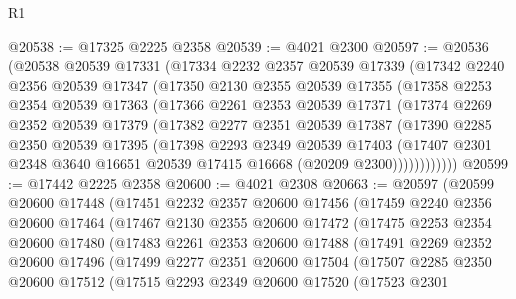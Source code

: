 \begin{lexlean}{R1}
\begin{coremodule}
@20538 := @17325 @2225 @2358
@20539 := @4021 @2300
@20597 := @20536
    (@20538
      @20539
      @17331
      (@17334
        @2232
        @2357
        @20539
        @17339
        (@17342
          @2240
          @2356
          @20539
          @17347
          (@17350
            @2130
            @2355
            @20539
            @17355
            (@17358
              @2253
              @2354
              @20539
              @17363
              (@17366
                @2261
                @2353
                @20539
                @17371
                (@17374
                  @2269
                  @2352
                  @20539
                  @17379
                  (@17382
                    @2277
                    @2351
                    @20539
                    @17387
                    (@17390
                      @2285
                      @2350
                      @20539
                      @17395
                      (@17398
                        @2293
                        @2349
                        @20539
                        @17403
                        (@17407
                          @2301
                          @2348
                          @3640
                          @16651
                          @20539
                          @17415
                          @16668
                          (@20209 @2300))))))))))))
@20599 := @17442 @2225 @2358
@20600 := @4021 @2308
@20663 := @20597
    (@20599
      @20600
      @17448
      (@17451
        @2232
        @2357
        @20600
        @17456
        (@17459
          @2240
          @2356
          @20600
          @17464
          (@17467
            @2130
            @2355
            @20600
            @17472
            (@17475
              @2253
              @2354
              @20600
              @17480
              (@17483
                @2261
                @2353
                @20600
                @17488
                (@17491
                  @2269
                  @2352
                  @20600
                  @17496
                  (@17499
                    @2277
                    @2351
                    @20600
                    @17504
                    (@17507
                      @2285
                      @2350
                      @20600
                      @17512
                      (@17515
                        @2293
                        @2349
                        @20600
                        @17520
                        (@17523
                          @2301

\end{coremodule}
\end{lexlean}
